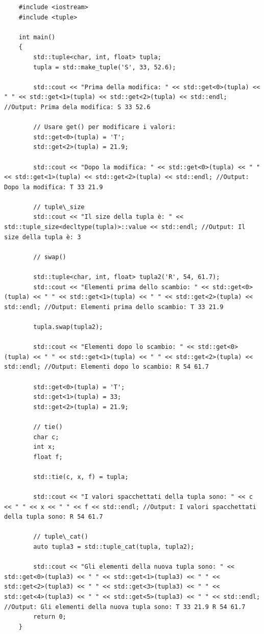 \begin{lstlisting}
	#include <iostream>
	#include <tuple>
	
	int main()
	{
		std::tuple<char, int, float> tupla;
		tupla = std::make_tuple('S', 33, 52.6);
		
		std::cout << "Prima della modifica: " << std::get<0>(tupla) << " " << std::get<1>(tupla) << std::get<2>(tupla) << std::endl; //Output: Prima dela modifica: S 33 52.6
		
		// Usare get() per modificare i valori:
		std::get<0>(tupla) = 'T';
		std::get<2>(tupla) = 21.9;
		
		std::cout << "Dopo la modifica: " << std::get<0>(tupla) << " " << std::get<1>(tupla) << std::get<2>(tupla) << std::endl; //Output: Dopo la modifica: T 33 21.9
		
		// tuple\_size
		std::cout << "Il size della tupla è: " << std::tuple_size<decltype(tupla)>::value << std::endl; //Output: Il size della tupla è: 3
		
		// swap()
		
		std::tuple<char, int, float> tupla2('R', 54, 61.7);
		std::cout << "Elementi prima dello scambio: " << std::get<0>(tupla) << " " << std::get<1>(tupla) << " " << std::get<2>(tupla) << std::endl; //Output: Elementi prima dello scambio: T 33 21.9
		
		tupla.swap(tupla2);
		
		std::cout << "Elementi dopo lo scambio: " << std::get<0>(tupla) << " " << std::get<1>(tupla) << " " << std::get<2>(tupla) << std::endl; //Output: Elementi dopo lo scambio: R 54 61.7
		
		std::get<0>(tupla) = 'T';
		std::get<1>(tupla) = 33;
		std::get<2>(tupla) = 21.9;
		
		// tie()
		char c;
		int x;
		float f;
		
		std::tie(c, x, f) = tupla;
		
		std::cout << "I valori spacchettati della tupla sono: " << c << " " << x << " " << f << std::endl; //Output: I valori spacchettati della tupla sono: R 54 61.7
		
		// tuple\_cat()
		auto tupla3 = std::tuple_cat(tupla, tupla2);
		
		std::cout << "Gli elementi della nuova tupla sono: " << std::get<0>(tupla3) << " " << std::get<1>(tupla3) << " " << std::get<2>(tupla3) << " " << std::get<3>(tupla3) << " " << std::get<4>(tupla3) << " " << std::get<5>(tupla3) << " " << std::endl; //Output: Gli elementi della nuova tupla sono: T 33 21.9 R 54 61.7
		return 0;
	}
\end{lstlisting}

